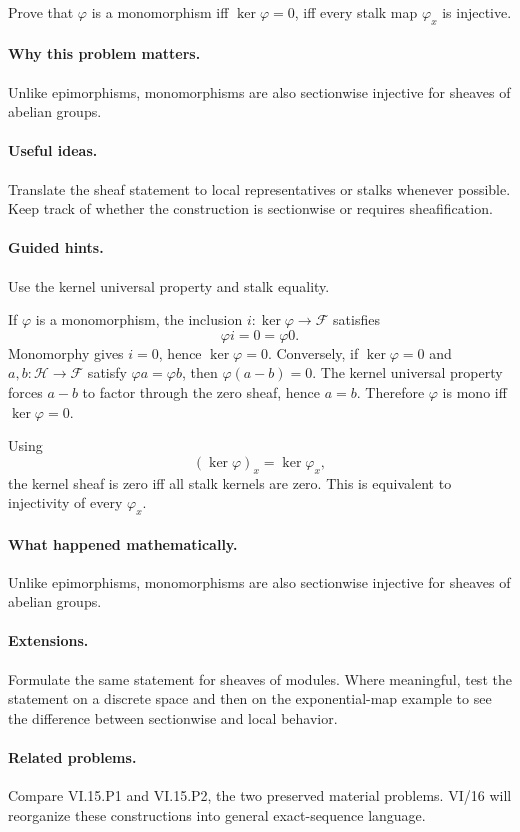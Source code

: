 \begin{problem}\label{prob:vi15-p11}
Prove that $\varphi$ is a monomorphism iff $\ker\varphi=0$, iff every stalk map $\varphi_x$ is injective.
\end{problem}

\ifdefined\FullProblemDossiers
\paragraph{Why this problem matters.}
Unlike epimorphisms, monomorphisms are also sectionwise injective for sheaves of abelian groups.

\paragraph{Useful ideas.}
Translate the sheaf statement to local representatives or stalks whenever possible.  Keep track of whether the construction is sectionwise or requires sheafification.

\paragraph{Guided hints.}
Use the kernel universal property and stalk equality.

\begin{solution}
If $\varphi$ is a monomorphism, the inclusion $i:\ker\varphi\to\mathcal F$ satisfies
\[
\varphi i=0=\varphi 0.
\]
Monomorphy gives $i=0$, hence $\ker\varphi=0$. Conversely, if $\ker\varphi=0$ and $a,b:\mathcal H\to\mathcal F$ satisfy $\varphi a=\varphi b$, then $\varphi(a-b)=0$. The kernel universal property forces $a-b$ to factor through the zero sheaf, hence $a=b$. Therefore $\varphi$ is mono iff $\ker\varphi=0$.

Using
\[
(\ker\varphi)_x=\ker\varphi_x,
\]
the kernel sheaf is zero iff all stalk kernels are zero. This is equivalent to injectivity of every $\varphi_x$.
\end{solution}

\paragraph{What happened mathematically.}
Unlike epimorphisms, monomorphisms are also sectionwise injective for sheaves of abelian groups.

\paragraph{Extensions.}
Formulate the same statement for sheaves of modules.  Where meaningful, test the statement on a discrete space and then on the exponential-map example to see the difference between sectionwise and local behavior.

\paragraph{Related problems.}
Compare VI.15.P1 and VI.15.P2, the two preserved material problems.  VI/16 will reorganize these constructions into general exact-sequence language.
\fi
